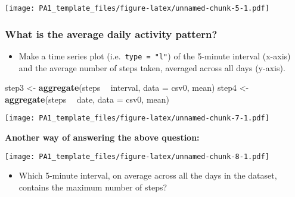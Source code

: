 \documentclass[
]{article}
\newenvironment{Shaded}{\begin{snugshade}}{\end{snugshade}}
\newcommand{\DataTypeTok}[1]{\textcolor[rgb]{0.13,0.29,0.53}{#1}}
\newcommand{\DecValTok}[1]{\textcolor[rgb]{0.00,0.00,0.81}{#1}}
\newcommand{\KeywordTok}[1]{\textcolor[rgb]{0.13,0.29,0.53}{\textbf{#1}}}
\newcommand{\NormalTok}[1]{#1}
\newcommand{\OperatorTok}[1]{\textcolor[rgb]{0.81,0.36,0.00}{\textbf{#1}}}
\newcommand{\StringTok}[1]{\textcolor[rgb]{0.31,0.60,0.02}{#1}}
\providecommand{\tightlist}{%
  \setlength{\itemsep}{0pt}\setlength{\parskip}{0pt}}
\begin{document}
\texttt{[image: PA1\_template\_files/figure-latex/unnamed-chunk-5-1.pdf]}

\hypertarget{what-is-the-average-daily-activity-pattern}{%
\subsubsection{What is the average daily activity
pattern?}\label{what-is-the-average-daily-activity-pattern}}

\begin{itemize}
\tightlist
\item
  Make a time series plot
  (i.e.~\color{red}{\verb|type = "l"|}\texttt{type\ =\ "l"}) of the
  5-minute interval (x-axis) and the average number of steps taken,
  averaged across all days (y-axis).
\end{itemize}

\begin{Shaded}
\begin{Highlighting}[]
\NormalTok{step3 <-}\StringTok{ }\KeywordTok{aggregate}\NormalTok{(steps }\OperatorTok{~}\StringTok{ }\NormalTok{interval, }\DataTypeTok{data =}\NormalTok{ csv0, mean)}
\NormalTok{step4 <-}\StringTok{ }\KeywordTok{aggregate}\NormalTok{(steps }\OperatorTok{~}\StringTok{ }\NormalTok{date, }\DataTypeTok{data =}\NormalTok{ csv0, mean)}
\end{Highlighting}
\end{Shaded}

\texttt{[image: PA1\_template\_files/figure-latex/unnamed-chunk-7-1.pdf]}

\textbf{Another way of answering the above question:}

\texttt{[image: PA1\_template\_files/figure-latex/unnamed-chunk-8-1.pdf]}

\begin{itemize}
\tightlist
\item
  Which 5-minute interval, on average across all the days in the
  dataset, contains the maximum number of steps?
\end{itemize}

\begin{Shaded}
\end{Shaded}
\end{document}
